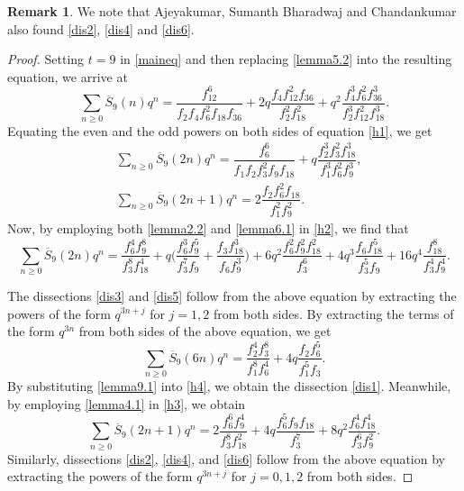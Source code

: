 \documentclass[12pt]{amsart}
\theoremstyle{plain}
\theoremstyle{definition}
\newtheorem{remark}{Remark}[section]
\begin{document}
\begin{remark}
We note that Ajeyakumar, Sumanth Bharadwaj and Chandankumar \cite[Theorem 3.2]{arxiv} also found \eqref{dis2}, \eqref{dis4} and \eqref{dis6}.
\end{remark}

\begin{proof} Setting $t=9$ in \eqref{maineq} and then replacing \eqref{lemma5.2} into the resulting equation, we arrive at
\begin{equation}
\sum_{n\geq 0} \overline{S}_{9}(n) q^{n} = \dfrac{f_{12}^{6}}{f_{2} f_{4} f_{6}^{2} f_{18} f_{36}} + 2q \dfrac{f_{4} f_{12}^{2} f_{36}}{f_{2}^{2} f_{18}^{2}}+ q^{2} \dfrac{f_{4}^{3} f_{6}^{2} f_{36}^{3}}{f_{2}^{3} f_{12}^{2} f_{18}^{3}}. \label{h1}
\end{equation}
Equating the even and the odd powers on both sides of equation \eqref{h1}, we get
\begin{align}
& \sum_{n\geq 0} \overline{S}_{9}(2n) q^{n} = \dfrac{f_{6}^{6}}{f_{1} f_{2} f_{3}^{2} f_{9} f_{18}} +q \dfrac{f_{2}^{3} f_{3}^{2} f_{18}^{3}}{f_{1}^{3} f_{6}^{2} f_{9}^{3}}, \label{h2}\\
& \sum_{n\geq 0} \overline{S}_{9}(2n+1) q^{n} = 2\dfrac{f_{2} f_{6}^{2} f_{18}}{f_{1}^{2} f_{9}^{2}}. \label{h3}
\end{align}
Now, by employing both \eqref{lemma2.2} and \eqref{lemma6.1} in \eqref{h2}, we find that
\[
\sum_{n\geq 0} \overline{S}_{9}(2n) q^{n} = \dfrac{f_{6}^{4} f_{9}^{8}}{f_{3}^{8} f_{18}^{4}} + q \bigg( \dfrac{f_{6}^{3} f_{9}^{5}}{f_{3}^{7} f_{9}} + \dfrac{f_{3} f_{18}^{3}}{f_{6} f_{9}^{3}} \bigg) + 6 q^{2} \dfrac{f_{6}^{2} f_{9}^{2} f_{18}^{2}}{f_{3}^{6}} + 4q^{3} \dfrac{f_{6} f_{18}^{5}}{f_{3}^{5} f_{9}} + 16q^{4} \dfrac{f_{18}^{8}}{f_{3}^{4} f_{9}^{4}}.
\]

The dissections \eqref{dis3} and \eqref{dis5} follow from the above equation by extracting the powers of the form $q^{3n+j}$ for $j=1,2$ from both sides. By extracting the terms of the form $q^{3n}$ from both sides of the above equation, we get
\begin{equation}
\sum_{n\geq 0} \overline{S}_{9}(6n) q^{n}=  \dfrac{f_{2}^{4} f_{3}^{8}}{f_{1}^{8} f_{6}^{4}} + 4q \dfrac{f_{2} f_{6}^{5}}{f_{1}^{5} f_{3}}. \label{h4}
\end{equation}
By substituting \eqref{lemma9.1} into \eqref{h4}, we obtain the dissection \eqref{dis1}. Meanwhile, by employing \eqref{lemma4.1} in \eqref{h3}, we obtain
\[
\sum_{n\geq 0} \overline{S}_{9}(2n+1) q^{n} = 2\dfrac{f_{6}^{6} f_{9}^{4}}{f_{3}^{8} f_{18}^{2}} + 4 q \dfrac{f_{6}^{5} f_{9} f_{18}}{f_{3}^{7}} +8q^{2} \dfrac{f_{6}^{4} f_{18}^{4}}{f_{3}^{6} f_{9}^{2}}.
\]
Similarly, dissections \eqref{dis2}, \eqref{dis4}, and \eqref{dis6} follow from the above equation by extracting the powers of the form $q^{3n+j}$ for $j=0,1,2$ from both sides.
\end{proof}
\end{document}
